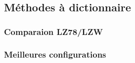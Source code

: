 \subsection{Méthodes à dictionnaire}

    \subsubsection{Comparaion LZ78/LZW}

    \subsubsection{Meilleures configurations}
